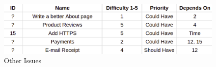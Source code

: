 \begin{figure}[H]
\centering
\includegraphics[width=\textwidth]{second_sprint/other.png}
\caption{\label{fig:sprint_4} Other Issues}
\end{figure}
